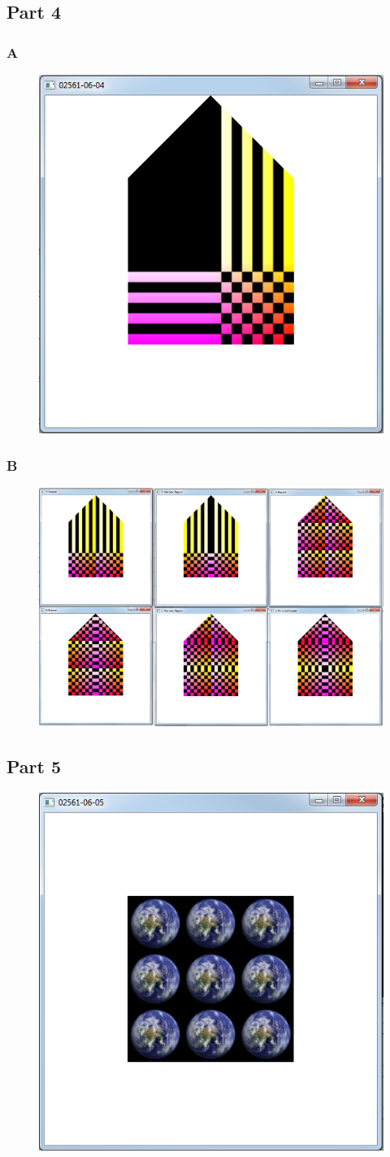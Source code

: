 \documentclass[11pt]{article}
\begin{document}
\subsection{Part 4}
\subsubsection{A}
\begin{figure}[H]
	\centering
	\includegraphics[width=0.5\linewidth]{images/e06p4a}
	\label{fig:e06p4a}
\end{figure}

\subsubsection{B}
\begin{figure}[H]
	\centering
	\includegraphics[width=0.5\linewidth]{images/e06p4b}
	\label{fig:e06p4b}
\end{figure}

\subsection{Part 5}
\begin{figure}[H]
	\centering
	\includegraphics[width=0.5\linewidth]{images/e06p5}
	\label{fig:e06p5}
\end{figure}
\end{document}
